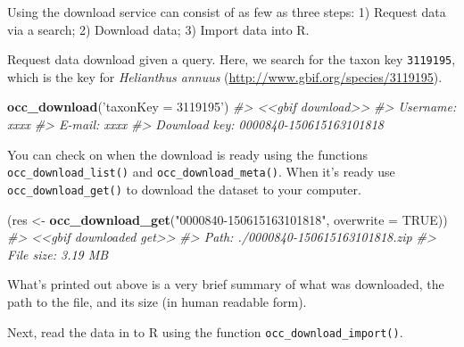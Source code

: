 \documentclass[author-year, review, 11pt]{components/elsarticle} %
\newenvironment{Shaded}{\begin{snugshade}}{\end{snugshade}}
\newcommand{\KeywordTok}[1]{\textcolor[rgb]{0.13,0.29,0.53}{\textbf{{#1}}}}
\newcommand{\DataTypeTok}[1]{\textcolor[rgb]{0.13,0.29,0.53}{{#1}}}
\newcommand{\StringTok}[1]{\textcolor[rgb]{0.31,0.60,0.02}{{#1}}}
\newcommand{\CommentTok}[1]{\textcolor[rgb]{0.56,0.35,0.01}{\textit{{#1}}}}
\newcommand{\OtherTok}[1]{\textcolor[rgb]{0.56,0.35,0.01}{{#1}}}
\newcommand{\NormalTok}[1]{{#1}}
\begin{document}
Using the download service can consist of as few as three steps: 1)
Request data via a search; 2) Download data; 3) Import data into R.

Request data download given a query. Here, we search for the taxon key
\texttt{3119195}, which is the key for \emph{Helianthus annuus}
(\url{http://www.gbif.org/species/3119195}).

\begin{Shaded}
\begin{Highlighting}[]
\KeywordTok{occ_download}\NormalTok{(}\StringTok{'taxonKey = 3119195'}\NormalTok{)}
\CommentTok{#> <<gbif download>>}
\CommentTok{#>   Username: xxxx}
\CommentTok{#>   E-mail: xxxx}
\CommentTok{#>   Download key: 0000840-150615163101818}
\end{Highlighting}
\end{Shaded}

You can check on when the download is ready using the functions
\texttt{occ\_download\_list()} and \texttt{occ\_download\_meta()}. When
it's ready use \texttt{occ\_download\_get()} to download the dataset to
your computer.

\begin{Shaded}
\begin{Highlighting}[]
\NormalTok{(res <-}\StringTok{ }\KeywordTok{occ_download_get}\NormalTok{(}\StringTok{"0000840-150615163101818"}\NormalTok{, }\DataTypeTok{overwrite =} \OtherTok{TRUE}\NormalTok{))}
\CommentTok{#> <<gbif downloaded get>>}
\CommentTok{#>   Path: ./0000840-150615163101818.zip}
\CommentTok{#>   File size: 3.19 MB}
\end{Highlighting}
\end{Shaded}

What's printed out above is a very brief summary of what was downloaded,
the path to the file, and its size (in human readable form).

Next, read the data in to R using the function
\texttt{occ\_download\_import()}.
\end{document}
